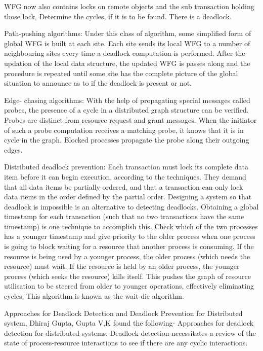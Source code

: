 \documentclass[sigplan,screen]{acmart}
\begin{document}
WFG now also contains locks on remote objects and the sub
transaction holding those lock, Determine the cycles, if it is
to be found. There is a deadlock.
\par
Path-pushing algorithms: Under this class of algorithm, some simplified form of global WFG is built at each site. Each site sends its local WFG to a number of neighbouring sites every time a deadlock computation is performed. After the updation of the local data structure, the updated WFG is passes along and the procedure is repeated until some site has the complete picture of the global situation to announce as to if the deadlock is present or not. 
\par
Edge- chasing algorithms: With the help of propagating special messages called probes, the presence of a cycle in a distributed graph structure can be verified. Probes are distinct from resource request and grant messages. When the initiator of such a probe
computation receives a matching probe, it knows that it is in cycle in the graph. Blocked processes propagate the probe along their
outgoing edges. 
\par
Distributed deadlock prevention: Each transaction must lock its complete data item before it can begin execution, according to the techniques. They demand that all data items be partially ordered, and that a transaction can only lock data items in the order defined by the partial order.
Designing a system so that deadlock is impossible is an alternative to detecting deadlocks. Obtaining a global timestamp for each transaction (such that no two transactions have the same timestamp) is one technique to accomplish this. Check which of the two processes has a younger timestamp and give priority to the older process when one process is going to block waiting for a resource that another process is consuming.
If the resource is being used by a younger process, the older process (which needs the resource) must wait. If the resource is held by an older process, the younger process (which seeks the resource) kills itself. This pushes the graph of resource utilisation to be steered from older to younger operations, effectively eliminating cycles. This algorithm is known as the wait-die algorithm.
\par
Approaches for Deadlock Detection and Deadlock Prevention for Distributed system, Dhiraj Gupta, Gupta V,K found the following-
Approaches for deadlock detection for distributed systems:
Deadlock detection necessitates a review of the state of process-resource interactions to see if there are any cyclic interactions.
\end{document}
